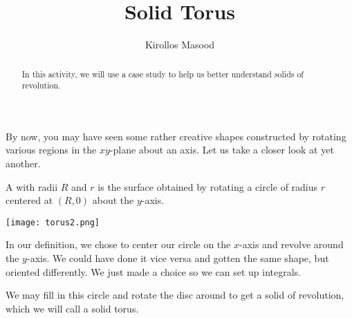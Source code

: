 \documentclass{ximera}
\title{Solid Torus}
\author{Kirollos Masood}
\begin{document}
\begin{abstract}
In this activity, we will use a case study to help us better understand solids of revolution.
\end{abstract}
\maketitle

By now, you may have seen some rather creative shapes constructed by rotating various regions in the $xy$-plane about an axis. Let us take a closer look at yet another.
\begin{definition}
	A  with radii $R$ and $r$ is the surface obtained by rotating a circle of radius $r$ centered at $(R,0)$ about the $y$-axis.
\end{definition}

\begin{image}
	\label{torus}
	\texttt{[image: torus2.png]}
\end{image}

\begin{comment}
\begin{onlineOnly}
\begin{center}
	\geogebra{rwdexdev}{1200}{600}
	
\end{center}
\end{onlineOnly}
\end{comment}


\begin{remark}
	In our definition, we chose to center our circle on the $x$-axis and revolve around the $y$-axis. We could have done it vice versa and gotten the same shape, but oriented differently. We just made a choice so we can set up integrals.
\end{remark} 

We may fill in this circle and rotate the disc around to get a solid of revolution, which we will call a solid torus.
\end{document}
